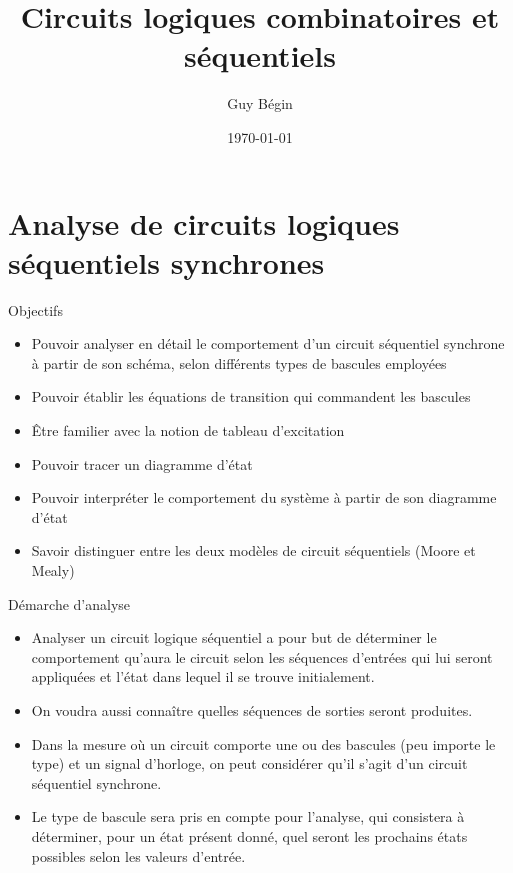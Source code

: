 \documentclass[presentation]{beamer}
\author{Guy Bégin}
\date{\today}
\title{Circuits logiques combinatoires et séquentiels}
\begin{document}
\maketitle

\section{Analyse de circuits logiques séquentiels synchrones}
\label{sec:orga4a65c0}
\begin{frame}[label={sec:org6862807}]{Objectifs}
\begin{itemize}
\item Pouvoir analyser en détail le comportement d'un circuit séquentiel
synchrone à partir de son schéma, selon différents types de bascules
employées
\item Pouvoir établir les équations de transition qui commandent les bascules
\item Être familier avec la notion de tableau d'excitation
\item Pouvoir tracer un diagramme d'état
\item Pouvoir interpréter le comportement du système à partir de son
diagramme d'état
\item Savoir distinguer entre les deux modèles de circuit séquentiels
(Moore et Mealy)
\end{itemize}
\end{frame}

\begin{frame}[label={sec:orge4ca596}]{Démarche d'analyse}
\begin{itemize}
\item Analyser un circuit logique séquentiel a pour but de déterminer le comportement qu'aura le circuit selon les séquences d'entrées qui lui seront appliquées et l'état dans lequel il se trouve initialement.

\item On voudra aussi connaître quelles séquences de sorties seront produites.

\item Dans la mesure où un circuit comporte une ou des bascules (peu importe le type) et un signal d'horloge, on peut considérer qu'il s'agit d'un circuit séquentiel synchrone.

\item Le type de bascule sera pris en compte pour l'analyse, qui consistera à déterminer, pour un état présent donné, quel seront les prochains états possibles selon les valeurs d'entrée.
\end{itemize}
\end{frame}
\end{document}
